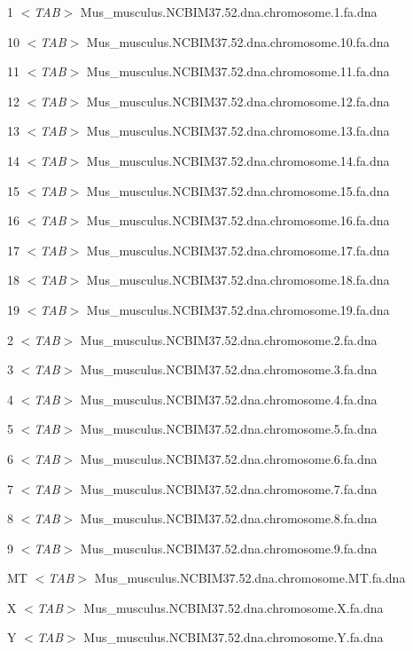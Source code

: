 1 {\em $<$TAB$>$\/} Mus\_\-musculus.NCBIM37.52.dna.chromosome.1.fa.dna \par
 10 {\em $<$TAB$>$\/} Mus\_\-musculus.NCBIM37.52.dna.chromosome.10.fa.dna \par
 11 {\em $<$TAB$>$\/} Mus\_\-musculus.NCBIM37.52.dna.chromosome.11.fa.dna \par
 12 {\em $<$TAB$>$\/} Mus\_\-musculus.NCBIM37.52.dna.chromosome.12.fa.dna \par
 13 {\em $<$TAB$>$\/} Mus\_\-musculus.NCBIM37.52.dna.chromosome.13.fa.dna \par
 14 {\em $<$TAB$>$\/} Mus\_\-musculus.NCBIM37.52.dna.chromosome.14.fa.dna \par
 15 {\em $<$TAB$>$\/} Mus\_\-musculus.NCBIM37.52.dna.chromosome.15.fa.dna \par
 16 {\em $<$TAB$>$\/} Mus\_\-musculus.NCBIM37.52.dna.chromosome.16.fa.dna \par
 17 {\em $<$TAB$>$\/} Mus\_\-musculus.NCBIM37.52.dna.chromosome.17.fa.dna \par
 18 {\em $<$TAB$>$\/} Mus\_\-musculus.NCBIM37.52.dna.chromosome.18.fa.dna \par
 19 {\em $<$TAB$>$\/} Mus\_\-musculus.NCBIM37.52.dna.chromosome.19.fa.dna \par
 2 {\em $<$TAB$>$\/} Mus\_\-musculus.NCBIM37.52.dna.chromosome.2.fa.dna \par
 3 {\em $<$TAB$>$\/} Mus\_\-musculus.NCBIM37.52.dna.chromosome.3.fa.dna \par
 4 {\em $<$TAB$>$\/} Mus\_\-musculus.NCBIM37.52.dna.chromosome.4.fa.dna \par
 5 {\em $<$TAB$>$\/} Mus\_\-musculus.NCBIM37.52.dna.chromosome.5.fa.dna \par
 6 {\em $<$TAB$>$\/} Mus\_\-musculus.NCBIM37.52.dna.chromosome.6.fa.dna \par
 7 {\em $<$TAB$>$\/} Mus\_\-musculus.NCBIM37.52.dna.chromosome.7.fa.dna \par
 8 {\em $<$TAB$>$\/} Mus\_\-musculus.NCBIM37.52.dna.chromosome.8.fa.dna \par
 9 {\em $<$TAB$>$\/} Mus\_\-musculus.NCBIM37.52.dna.chromosome.9.fa.dna \par
 MT {\em $<$TAB$>$\/} Mus\_\-musculus.NCBIM37.52.dna.chromosome.MT.fa.dna \par
 X {\em $<$TAB$>$\/} Mus\_\-musculus.NCBIM37.52.dna.chromosome.X.fa.dna \par
 Y {\em $<$TAB$>$\/} Mus\_\-musculus.NCBIM37.52.dna.chromosome.Y.fa.dna \par


